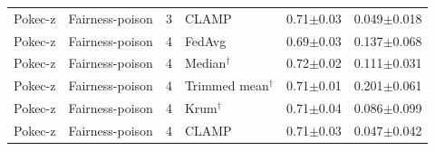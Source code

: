 \begin{longtable}{llclcc}
Pokec-z & Fairness-poison & 3 & CLAMP & 0.71$\pm$0.03 & 0.049$\pm$0.018 \\
Pokec-z & Fairness-poison & 4 & FedAvg & 0.69$\pm$0.03 & 0.137$\pm$0.068 \\
Pokec-z & Fairness-poison & 4 & Median$^\dagger$ & 0.72$\pm$0.02 & 0.111$\pm$0.031 \\
Pokec-z & Fairness-poison & 4 & Trimmed mean$^\dagger$ & 0.71$\pm$0.01 & 0.201$\pm$0.061 \\
Pokec-z & Fairness-poison & 4 & Krum$^\dagger$ & 0.71$\pm$0.04 & 0.086$\pm$0.099 \\
Pokec-z & Fairness-poison & 4 & CLAMP & 0.71$\pm$0.03 & 0.047$\pm$0.042 \\
\end{longtable}
